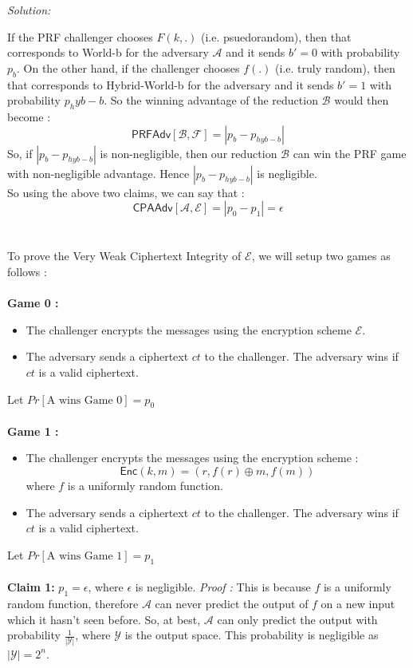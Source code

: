 \documentclass[a4paper, 11pt]{article}
\newenvironment{solution}
    {\textit{Solution:}}
    {\clearpage}
\newcommand{\enc}{\mathsf{Enc}}
\newcommand{\prf}{\mathsf{PRFAdv}}
\newcommand{\calA}{\mathcal{A}}
\newcommand{\calB}{\mathcal{B}}
\newcommand{\calE}{\mathcal{E}}
\newcommand{\calF}{\mathcal{F}}
\newcommand{\calY}{\mathcal{Y}}
\begin{document}
\begin{solution}
\begin{itemize}
    \end{itemize}
    If the PRF challenger chooses $F(k, .)$ (i.e. psuedorandom), then that corresponds to World-b for the adversary $\calA$ and it sends $b' = 0$ with probability $p_b$. On the other hand, if the challenger chooses $f(.)$ (i.e. truly random), then that corresponds to Hybrid-World-b for the adversary and it sends $b' = 1$ with probability $p_hyb-b$.
    So the winning advantage of the reduction $\calB$ would then become :
    $$\prf[\calB, \calF] = | p_{b} - p_{hyb-b} |$$ So, if $| p_{b} - p_{hyb-b} |$ is non-negligible, then our reduction $\calB$ can win the PRF game with non-negligible advantage. Hence $| p_{b} - p_{hyb-b} |$ is negligible.\\ 
    So using the above two claims, we can say that :
$$\mathsf{CPAAdv}[\calA, \calE] = |p_0 - p_1| = \epsilon$$ \\ \\ 
To prove the Very Weak Ciphertext Integrity of $\calE$, we will setup two games as follows : \\ \\ 
\textbf{Game 0 :} 
\begin{itemize}
    \item The challenger encrypts the messages using the encryption scheme $\calE$. 
    \item The adversary sends a ciphertext $ct$ to the challenger. The adversary wins if $ct$ is a valid ciphertext.
\end{itemize}
Let $Pr[\text{A wins Game 0}] = p_0$ \\ \\
\textbf{Game 1 :} 
\begin{itemize}
    \item The challenger encrypts the messages using the encryption scheme : 
    $$\enc(k, m) = (r, f(r) \oplus m, f(m))$$ where $f$ is a uniformly random function.
    \item The adversary sends a ciphertext $ct$ to the challenger. The adversary wins if $ct$ is a valid ciphertext.
\end{itemize}
Let $Pr[\text{A wins Game 1}] = p_1$ \\ \\
\textbf{Claim 1: } $p_1 = \epsilon$, where $\epsilon$ is negligible.
\textit{Proof : } This is because $f$ is a uniformly random function, therefore $\calA$ can never predict the output of $f$ on a new input which it hasn't seen before. So, at best, $\calA$ can only predict the output with probability $\frac{1}{|\calY|}$, where $\calY$ is the output space. This probability is negligible as $|\calY| = 2^n$. \\ \\ 

\end{solution}
\end{document}

